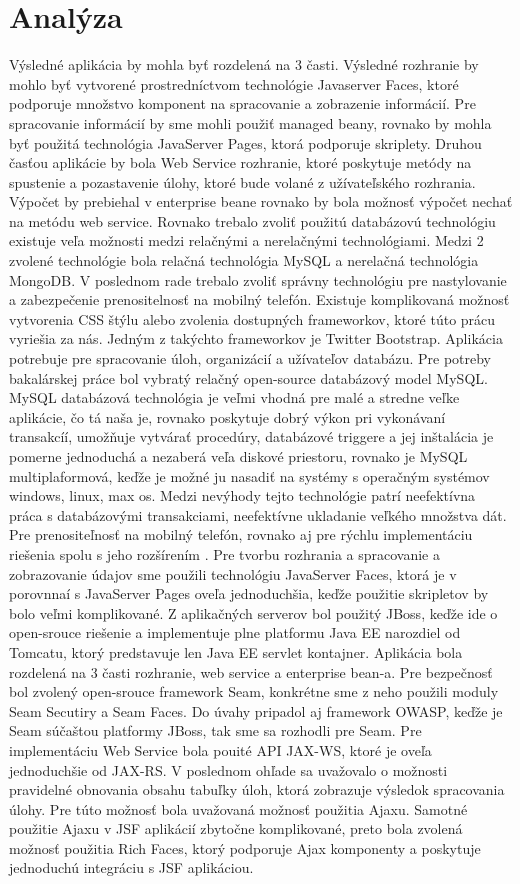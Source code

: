\section{Analýza}
Výsledné aplikácia by mohla byť rozdelená na 3 časti. Výsledné rozhranie by mohlo byť vytvorené prostredníctvom technológie Javaserver Faces, ktoré podporuje množstvo komponent na spracovanie a zobrazenie informácií. Pre spracovanie informácií by sme mohli použiť managed beany, rovnako by mohla byť použitá technológia JavaServer Pages, ktorá podporuje skriplety. Druhou časťou aplikácie by bola Web Service rozhranie, ktoré poskytuje metódy na spustenie a pozastavenie úlohy, ktoré bude volané z užívateľského rozhrania. Výpočet by prebiehal v enterprise beane rovnako by bola možnosť výpočet nechať na metódu web service. Rovnako trebalo zvoliť použitú databázovú technológiu existuje veľa možnosti medzi relačnými a nerelačnými technológiami. Medzi 2 zvolené technológie bola relačná technológia MySQL a nerelačná technológia MongoDB. V poslednom rade trebalo zvoliť správny technológiu pre nastylovanie a zabezpečenie prenositelnosť na mobilný telefón. Existuje komplikovaná možnosť  vytvorenia CSS štýlu alebo zvolenia dostupných frameworkov, ktoré túto prácu vyriešia za nás. Jedným z takýchto frameworkov je Twitter Bootstrap. Aplikácia potrebuje pre spracovanie úloh, organizácií a užívateľov databázu. Pre potreby bakalárskej práce bol vybratý relačný open-source databázový model MySQL. MySQL databázová technológia je veľmi vhodná pre malé a stredne veľke aplikácie, čo tá naša je, rovnako poskytuje dobrý výkon pri vykonávaní transakcíí, umožňuje vytvárať procedúry, databázové triggere a jej inštalácia je pomerne jednoduchá a nezaberá veľa diskové priestoru, rovnako je MySQL multiplaformová, keďže je možné ju nasadiť na systémy s operačným systémov windows, linux, max os. Medzi nevýhody tejto technológie patrí neefektívna práca s databázovými transakciami, neefektívne ukladanie veľkého množstva dát. Pre prenositeľnosť na mobilný telefón, rovnako aj pre rýchlu implementáciu riešenia spolu s jeho rozšírením . Pre tvorbu rozhrania a spracovanie a zobrazovanie údajov sme použili technológiu JavaServer Faces, ktorá je v porovnnaí s JavaServer Pages oveľa jednoduchšia, keďže použitie skripletov by bolo veľmi komplikované. Z aplikačných serverov bol použitý JBoss, keďže ide o open-srouce riešenie a implementuje plne platformu Java EE narozdiel od Tomcatu, ktorý predstavuje len Java EE servlet kontajner. Aplikácia bola rozdelená na 3 časti rozhranie, web service a enterprise bean-a. Pre bezpečnosť bol zvolený open-srouce framework Seam, konkrétne sme z neho použili moduly Seam Secutiry a Seam Faces. Do úvahy pripadol aj framework OWASP, keďže je Seam súčaštou platformy JBoss, tak sme sa rozhodli pre Seam. Pre implementáciu Web Service bola pouité API JAX-WS, ktoré je oveľa jednoduchšie od JAX-RS. V poslednom ohľade sa uvažovalo o možnosti pravidelné obnovania obsahu tabuľky úloh, ktorá zobrazuje výsledok spracovania úlohy. Pre túto možnosť bola uvažovaná možnosť použitia Ajaxu. Samotné použitie Ajaxu v JSF aplikácií zbytočne komplikované, preto bola zvolená možnosť použitia Rich Faces, ktorý podporuje Ajax komponenty a poskytuje jednoduchú integráciu s JSF aplikáciou.



